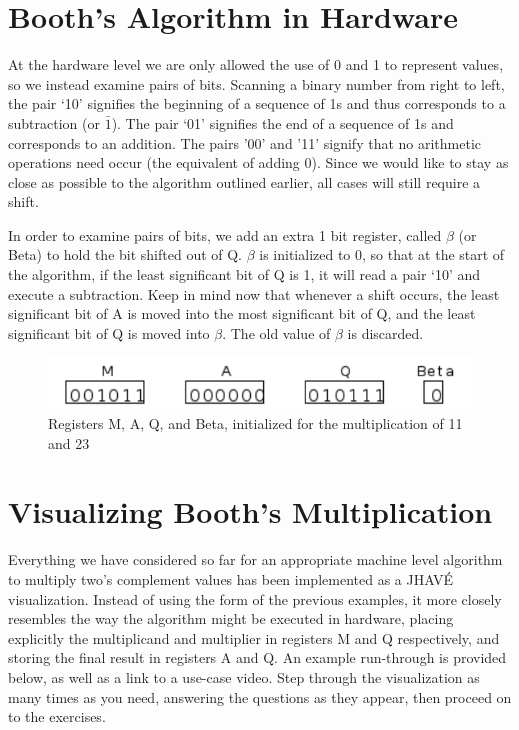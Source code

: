 \documentclass{article}
\begin{document}

\section{Booth's Algorithm in Hardware}
    At the hardware level we are only allowed the use of 0 and 1 to represent values, so we instead examine pairs of bits.
Scanning a binary number from right to left, the pair `10' signifies the beginning of a sequence of 1s and thus corresponds to a subtraction (or $\bar{1}$).
The pair `01' signifies the end of a sequence of 1s and corresponds to an addition.
The pairs '00' and '11' signify that no arithmetic operations need occur (the equivalent of adding 0).
Since we would like to stay as close as possible to the algorithm outlined earlier, all cases will still require a shift.

    In order to examine pairs of bits, we add an extra 1 bit register, called $\beta$ (or Beta) to hold the bit shifted out of Q.
$\beta$ is initialized to 0, so that at the start of the algorithm, if the least significant bit of Q is 1, it will read a pair `10' and execute a subtraction.
Keep in mind now that whenever a shift occurs, the least significant bit of A is moved into the most significant bit of Q, and the least significant bit of Q is moved into $\beta$.
The old value of $\beta$ is discarded.

\begin{figure}[h]
\centering
\includegraphics{init2.pdf}
\caption{Registers M, A, Q, and Beta, initialized for the multiplication of 11 and 23}
\end{figure}

\section{Visualizing Booth's Multiplication}
Everything we have considered so far for an appropriate machine level algorithm to multiply two's complement values has been implemented as a JHAVÉ visualization.
Instead of using the form of the previous examples, it more closely resembles the way the algorithm might be executed in hardware, placing explicitly the multiplicand and multiplier in registers M and Q respectively, and storing the final result in registers A and Q.
An example run-through is provided below, as well as a link to a use-case video.
Step through the visualization as many times as you need, answering the questions as they appear, then proceed on to the exercises.
\end{document}
